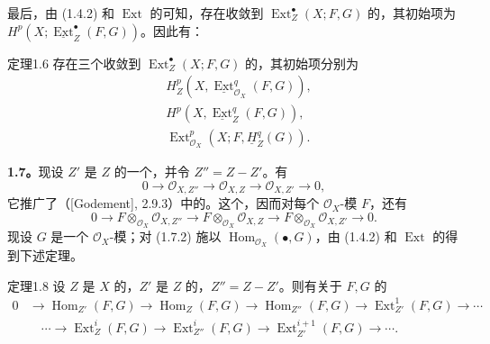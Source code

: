 最后，由 (1.4.2) 和 $\operatorname{Ext}$ 的可知，存在收敛到 $\operatorname{Ext}^{\bullet}_Z(X;F,G)$ 的，其初始项为 $H^p(X;\underline{\operatorname{Ext}}^{\bullet}_Z(F,G))$。因此有：
\begin{SGAresult}{定理}{1.6}
存在三个收敛到 $\operatorname{Ext}^{\bullet}_Z(X;F,G)$ 的，其初始项分别为
\begin{align}
&H^p_Z(X,\underline{\operatorname{Ext}}^q_{\mathscr O_X}(F,G)),\tag{1.6.1}\\
&H^p(X,\underline{\operatorname{Ext}}^q_Z(F,G)),\tag{1.6.2}\\
&\operatorname{Ext}^p_{\mathscr O_X}(X;F,\underline H^q_Z(G)).\tag{1.6.3}
\end{align}
\end{SGAresult}
\textbf{1.7。}现设 $Z'$ 是 $Z$ 的一个，并令 $Z''=Z-Z'$。有
\[
0\longrightarrow\mathscr O_{X,Z''}\longrightarrow\mathscr O_{X,Z}
\longrightarrow\mathscr O_{X,Z'}\longrightarrow0,\tag{1.7.1}
\]
它推广了（[Godement], 2.9.3）中的。这个，因而对每个 $\mathscr O_X$-模 $F$，还有
\[
0\longrightarrow F\otimes_{\mathscr O_X}\mathscr O_{X,Z''}
\longrightarrow F\otimes_{\mathscr O_X}\mathscr O_{X,Z}
\longrightarrow F\otimes_{\mathscr O_X}\mathscr O_{X,Z'}\longrightarrow0.\tag{1.7.2}
\]
现设 $G$ 是一个 $\mathscr O_X$-模；对 (1.7.2) 施以 $\operatorname{Hom}_{\mathscr O_X}(\bullet,G)$，由 (1.4.2) 和 $\operatorname{Ext}$ 的得到下述定理。
\begin{SGAresult}{定理}{1.8}
设 $Z$ 是 $X$ 的，$Z'$ 是 $Z$ 的，$Z''=Z-Z'$。则有关于 $F,G$ 的
\[
\begin{aligned}
0&\longrightarrow\operatorname{Hom}_{Z'}(F,G)\longrightarrow\operatorname{Hom}_Z(F,G)
\longrightarrow\operatorname{Hom}_{Z''}(F,G)\longrightarrow\operatorname{Ext}^1_{Z'}(F,G)\longrightarrow\cdots\\
&\quad\cdots\longrightarrow\operatorname{Ext}^i_Z(F,G)\longrightarrow\operatorname{Ext}^i_{Z''}(F,G)
\longrightarrow\operatorname{Ext}^{i+1}_{Z'}(F,G)\longrightarrow\cdots.
\end{aligned}
\]
\end{SGAresult}

